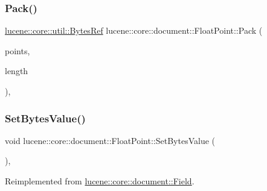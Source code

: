 \subsubsection{\texorpdfstring{Pack()}{Pack()}}
{\footnotesize\ttfamily \mbox{\hyperlink{classlucene_1_1core_1_1util_1_1BytesRef}{lucene\+::core\+::util\+::\+Bytes\+Ref}} lucene\+::core\+::document\+::\+Float\+Point\+::\+Pack (\begin{DoxyParamCaption}\item[{\mbox{\hyperlink{ZlibCrc32_8h_a2c212835823e3c54a8ab6d95c652660e}{const}} float $\ast$}]{points,  }\item[{\mbox{\hyperlink{ZlibCrc32_8h_a2c212835823e3c54a8ab6d95c652660e}{const}} uint32\+\_\+t}]{length }\end{DoxyParamCaption})\hspace{0.3cm}{\ttfamily [inline]}, {\ttfamily [private]}}

\mbox{\label{classlucene_1_1core_1_1document_1_1FloatPoint_a8862567e2ebfd0b8192eaec0967a943a}} 
\subsubsection{\texorpdfstring{Set\+Bytes\+Value()}{SetBytesValue()}}
{\footnotesize\ttfamily void lucene\+::core\+::document\+::\+Float\+Point\+::\+Set\+Bytes\+Value (\begin{DoxyParamCaption}\item[{\mbox{\hyperlink{ZlibCrc32_8h_a2c212835823e3c54a8ab6d95c652660e}{const}} \mbox{\hyperlink{classlucene_1_1core_1_1util_1_1BytesRef}{lucene\+::core\+::util\+::\+Bytes\+Ref}} \&}]{ }\end{DoxyParamCaption})\hspace{0.3cm}{\ttfamily [inline]}, {\ttfamily [virtual]}}



Reimplemented from \mbox{\hyperlink{classlucene_1_1core_1_1document_1_1Field_a41d077e63ce6fae8677b8df6b29821bd}{lucene\+::core\+::document\+::\+Field}}.

\mbox{\label{classlucene_1_1core_1_1document_1_1FloatPoint_a4e1f81bce5f905e267a32c4882faf90e}} 
